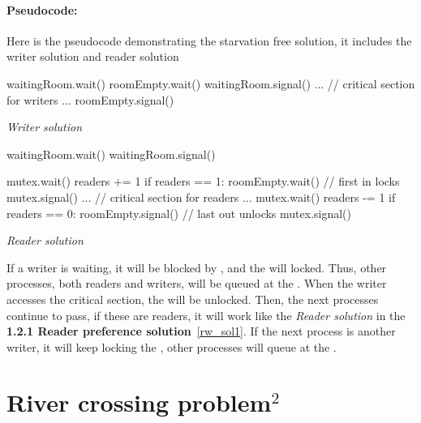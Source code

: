 \documentclass[a4paper, 10pt]{article}
\begin{document}
\paragraph{Pseudocode:} Here is the pseudocode demonstrating the starvation free solution, it includes the writer solution and reader solution
\begin{mycodeblock}
waitingRoom.wait()
    roomEmpty.wait()
waitingRoom.signal()
...
// critical section for writers
...
roomEmpty.signal()
\end{mycodeblock}
\begin{center}
    \textit{Writer solution}
\end{center}
\begin{mycodeblock}
waitingRoom.wait()
waitingRoom.signal()

mutex.wait()
    readers += 1
    if readers == 1:
        roomEmpty.wait()      // first in locks
mutex.signal()
...
// critical section for readers
...
mutex.wait()
    readers -= 1
    if readers == 0:
        roomEmpty.signal()    // last out unlocks
mutex.signal()
\end{mycodeblock}
\begin{center}
    \textit{Reader solution}
\end{center}
If a writer is waiting, it will be blocked by {}, and the {} will locked. Thus, other processes, both readers and writers, will be queued at the {}. When the writer accesses the critical section, the {} will be unlocked. Then, the next processes continue to pass, if these are readers, it will work like the \textit{Reader solution} in the \textbf{1.2.1 Reader preference solution}~\ref{rw_sol1}. If the next process is another writer, it will keep locking the {}, other processes will queue at the {}. 
\section{River crossing problem$^2$}\label{s:2}
\end{document}

